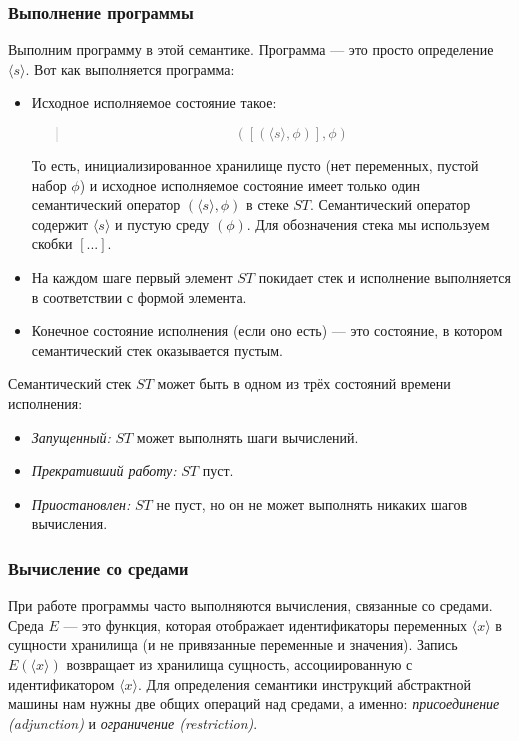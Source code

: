 \subsubsection{Выполнение программы}

Выполним программу в этой семантике. Программа --- это просто определение $\langle s \rangle$. Вот как выполняется программа:

\begin{itemize}
\item{Исходное исполняемое состояние такое:

  \begin{quote}
    $$([(\langle s \rangle, \phi)], \phi)$$
  \end{quote}
  
То есть, инициализированное хранилище пусто (нет переменных, пустой набор $\phi$) и исходное исполняемое состояние имеет только один семантический оператор $(\langle s \rangle, \phi)$ в стеке $ST$. Семантический оператор содержит $\langle s \rangle$ и пустую среду $(\phi)$. Для обозначения стека мы используем скобки $[ ... ]$.}

\item{На каждом шаге первый элемент $ST$ покидает стек и исполнение выполняется в соответствии с формой элемента.}

\item{Конечное состояние исполнения (если оно есть) --- это состояние, в котором семантический стек оказывается пустым.}
\end{itemize}

Семантический стек $ST$ может быть в одном из трёх состояний времени исполнения:

\begin{itemize}
\item{\emph{Запущенный:} $ST$ может выполнять шаги вычислений.}

\item{\emph{Прекративший работу:} $ST$ пуст.}

\item{\emph{Приостановлен:} $ST$ не пуст, но он не может выполнять никаких шагов вычисления.}
\end{itemize}

\subsubsection{Вычисление со средами}

При работе программы часто выполняются вычисления, связанные со средами. Среда $E$ --- это функция, которая отображает идентификаторы переменных $\langle x \rangle$ в сущности хранилища (и не привязанные переменные и значения). Запись $E(\langle x \rangle)$ возвращает из хранилища сущность, ассоциированную с идентификатором $\langle x \rangle$. Для определения семантики инструкций абстрактной машины нам нужны две общих операций над средами, а именно: \emph{присоединение (adjunction)} и \emph{ограничение (restriction)}.

